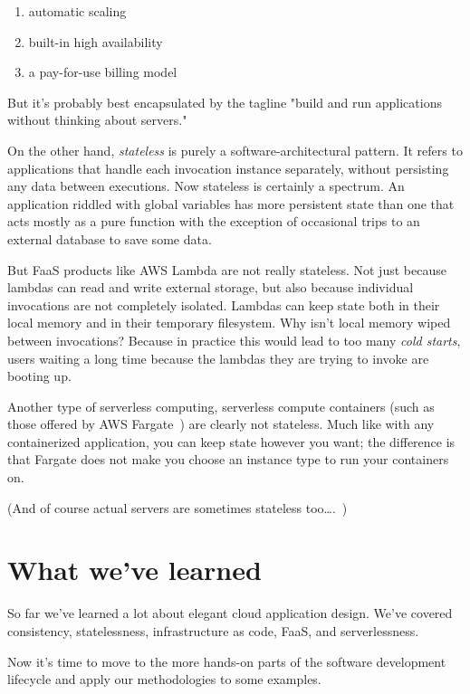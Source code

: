 \documentclass{article}
\newcommand{\noterm}[1]{\textit{#1}}
\newcommand{\term}[1]{\noterm{#1}\index{#1}}
\begin{document}
\begin{enumerate}
    \item automatic scaling
    \item built-in high availability
    \item a pay-for-use billing model
\end{enumerate}

But it's probably best encapsulated by the tagline "build and run applications without thinking about servers."

On the other hand, \term{stateless} is purely a software-architectural pattern.
It refers to applications that handle each invocation instance separately, without persisting any data between executions.
Now stateless is certainly a spectrum.
An application riddled with global variables has more persistent state than one that acts mostly as a pure function with the exception of occasional trips to an external database to save some data.

But FaaS products like AWS Lambda are not really stateless.
Not just because lambdas can read and write external storage, but also because individual invocations are not completely isolated.
Lambdas can keep state both in their local memory and in their temporary filesystem.
Why isn't local memory wiped between invocations?
Because in practice this would lead to too many \term{cold starts}, users waiting a long time because the lambdas they are trying to invoke are booting up.

Another type of serverless computing, serverless compute containers (such as those offered by AWS Fargate~\cite{fargate}) are clearly not stateless.
Much like with any containerized application, you can keep state however you want; the difference is that Fargate does not make you choose an instance type to run your containers on.

(And of course actual servers are sometimes stateless too\ldots.~\cite{xkcd-1})

\section{What we've learned}

So far we've learned a lot about elegant cloud application design.
We've covered consistency, statelessness, infrastructure as code, FaaS, and serverlessness.

Now it's time to move to the more hands-on parts of the software development lifecycle and apply our methodologies to some examples.
\end{document}
